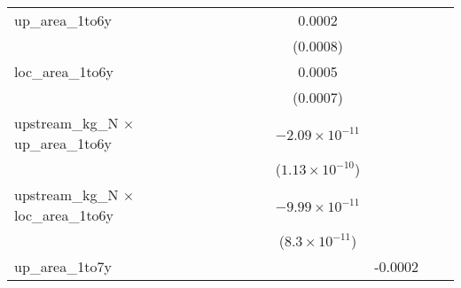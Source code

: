 \begin{tabular}{lcccccccc}
   up\_area\_1to6y                                &                          &                          &                          &                          & 0.0002                   &                          &                          &   \\   
                                                  &                          &                          &                          &                          & (0.0008)                 &                          &                          &   \\   
   loc\_area\_1to6y                               &                          &                          &                          &                          & 0.0005                   &                          &                          &   \\   
                                                  &                          &                          &                          &                          & (0.0007)                 &                          &                          &   \\   
   upstream\_kg\_N $\times$ up\_area\_1to6y       &                          &                          &                          &                          & $-2.09\times 10^{-11}$   &                          &                          &   \\   
                                                  &                          &                          &                          &                          & ($1.13\times 10^{-10}$)  &                          &                          &   \\   
   upstream\_kg\_N $\times$ loc\_area\_1to6y      &                          &                          &                          &                          & $-9.99\times 10^{-11}$   &                          &                          &   \\   
                                                  &                          &                          &                          &                          & ($8.3\times 10^{-11}$)   &                          &                          &   \\   
   up\_area\_1to7y                                &                          &                          &                          &                          &                          & -0.0002                  &                          &   \\   

\end{tabular}
